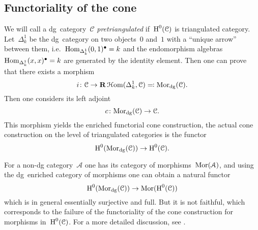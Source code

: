 \begin{refsection}
\subsection{Functoriality of the cone}
We will call a dg~category~$\mathcal{C}$ \emph{pretriangulated} if~$\operatorname{H}^0(\mathcal{C})$ is triangulated category. Let~$\Delta_k^1$ be the dg~category on two objects~$0$ and~$1$ with a ``unique arrow'' between them, i.e.~$\mathrm{Hom}_{\Delta_k^1}(0,1)^\bullet=k$ and the endomorphism algebras~$\mathrm{Hom}_{\Delta_k^1}(x,x)^\bullet=k$ are generated by the identity element.  Then one can prove that there exists a morphism
\begin{equation}
  i\colon\mathcal{C}\to\mathbf{R}\operatorname{\mathcal{H}om}(\Delta_k^1,\mathcal{C})\eqqcolon\mathrm{Mor}_{\mathrm{dg}}(\mathcal{C}).
\end{equation}
Then one considers its left adjoint
\begin{equation}
  c\colon\mathrm{Mor}_{\mathrm{dg}}(\mathcal{C})\to\mathcal{C}.
\end{equation}
This morphism yields the enriched functorial cone construction, the actual cone construction on the level of triangulated categories is the functor
\begin{equation}
  \operatorname{H}^0(\mathrm{Mor}_{\mathrm{dg}}(\mathcal{C}))\to\operatorname{H}^0(\mathcal{C}).
\end{equation}

For a non-dg category~$\mathcal{A}$ one has its category of morphisms~$\mathrm{Mor}(\mathcal{A})$, and using the dg~enriched category of morphisms one can obtain a natural functor
\begin{equation}
  \operatorname{H}^0(\mathrm{Mor}_{\mathrm{dg}}(\mathcal{C}))\to\mathrm{Mor}(\operatorname{H}^0(\mathcal{C}))
\end{equation}
which is in general essentially surjective and full. But it is not faithful, which corresponds to the failure of the functoriality of the cone construction for morphisms in~$\operatorname{H}^0(\mathcal{C})$. For a more detailed discussion, see \cite[section 5.1]{lnm2008}.


\end{refsection}
